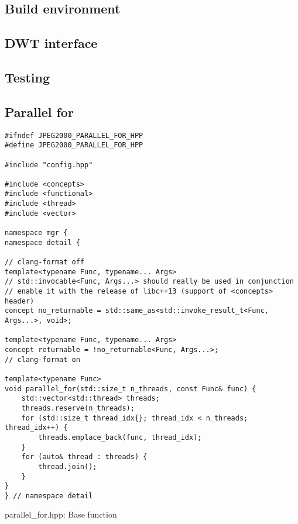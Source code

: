 \subsection{Build environment}

\subsection{DWT interface}

\subsection{Testing}

\subsection{Parallel for}

\begin{listing}[htb]
\begin{verbatim}
#ifndef JPEG2000_PARALLEL_FOR_HPP
#define JPEG2000_PARALLEL_FOR_HPP

#include "config.hpp"

#include <concepts>
#include <functional>
#include <thread>
#include <vector>

namespace mgr {
namespace detail {

// clang-format off
template<typename Func, typename... Args>
// std::invocable<Func, Args...> should really be used in conjunction
// enable it with the release of libc++13 (support of <concepts> header)
concept no_returnable = std::same_as<std::invoke_result_t<Func, Args...>, void>;

template<typename Func, typename... Args>
concept returnable = !no_returnable<Func, Args...>;
// clang-format on

template<typename Func>
void parallel_for(std::size_t n_threads, const Func& func) {
    std::vector<std::thread> threads;
    threads.reserve(n_threads);
    for (std::size_t thread_idx{}; thread_idx < n_threads; thread_idx++) {
        threads.emplace_back(func, thread_idx);
    }
    for (auto& thread : threads) {
        thread.join();
    }
}
} // namespace detail
\end{verbatim}
\caption{parallel\_for.hpp: Base function}
\label{lst:parallel_for_base_function}
\end{listing}

